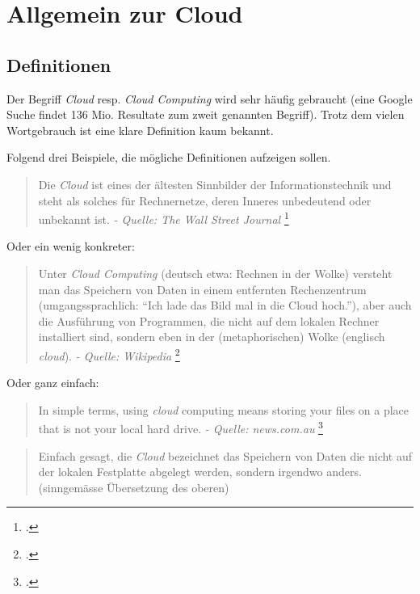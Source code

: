 \chapter{Allgemein zur Cloud}

\section{Definitionen}


Der Begriff \textit{Cloud} resp. \textit{Cloud Computing} wird sehr häufig gebraucht (eine Google Suche findet 136 Mio. Resultate zum zweit genannten Begriff).
Trotz dem vielen Wortgebrauch ist eine klare Definition kaum bekannt.

Folgend drei Beispiele, die mögliche Definitionen aufzeigen sollen.

\begin{quote}
	Die \textit{Cloud} ist eines der ältesten Sinnbilder der Informationstechnik und steht als solches für Rechnernetze, deren Inneres unbedeutend oder unbekannt ist. \textit{- Quelle: The Wall Street Journal}  \footcite{The_Internet_Industry_Is_on_a_Cloud_--_Whatever_That_May_Mean_-_WSJ_2014-10-03}
\end{quote}

Oder ein wenig konkreter:

\begin{quote}
	Unter \textit{Cloud Computing} (deutsch etwa: Rechnen in der Wolke) versteht man das Speichern von Daten in einem entfernten Rechenzentrum (umgangssprachlich: "`Ich lade das Bild mal in die Cloud hoch."'), aber auch die Ausführung von Programmen, die nicht auf dem lokalen Rechner installiert sind, sondern eben in der (metaphorischen) Wolke (englisch \textit{cloud}). \textit{- Quelle: Wikipedia} \footcite{Cloud_Computing__Wikipedia_2014-10-03}
\end{quote}

Oder ganz einfach:

\begin{quote}
	In simple terms, using \textit{cloud} computing means storing your files on a place that is not your local hard drive.  \textit{- Quelle: news.com.au} \footcite{What_really_is_The_Cloud?_And_how_does_it_work?_A_simple_explainer_2014-10-31}
\end{quote}
\begin{quote}
	Einfach gesagt, die \textit{Cloud} bezeichnet das Speichern von Daten die nicht auf der lokalen Festplatte abgelegt werden, sondern irgendwo anders. (sinngemässe Übersetzung des oberen)
\end{quote}

